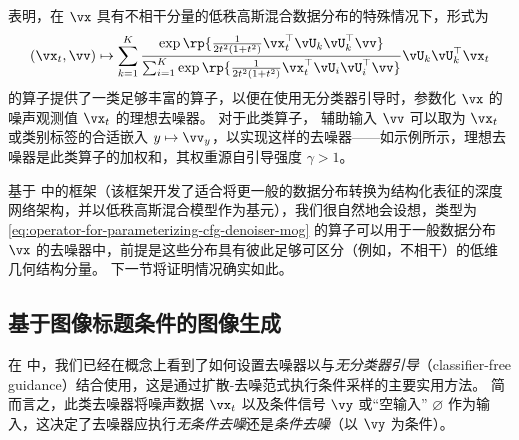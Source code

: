 \documentclass[../../book-main_zh.tex]{subfiles}
\begin{document}
 表明，在 $\vx$ 具有不相干分量的低秩高斯混合数据分布的特殊情况下，形式为
\begin{equation}\label{eq:operator-for-parameterizing-cfg-denoiser-mog}
    (\vx_t, \vv) \mapsto
    \sum_{k = 1}^{K}\frac{
        \exp\rp{\frac{1}{2t^{2}(1
        + t^{2})}\vx_t^\top \vU_k \vU_k^\top \vv}
    }
    {
        \sum_{i
        = 1}^{K}\exp\rp{\frac{1}{2t^{2}(1
        + t^{2})}\vx_t^\top \vU_i \vU_i^\top \vv}
    }
    \vU_{k}\vU_{k}^{\top}\vx_t
\end{equation}
的算子提供了一类足够丰富的算子，以便在使用无分类器引导时，参数化 $\vx$ 的噪声观测值 $\vx_t$ 的理想去噪器。
对于此类算子，
辅助输入 $\vv$ 可以取为 $\vx_t$ 或类别标签的合适嵌入 $y \mapsto \vv_y$，以实现这样的去噪器——如示例所示，理想去噪器是此类算子的加权和，其权重源自引导强度 $\gamma>1$。

基于  中的框架（该框架开发了适合将更一般的数据分布转换为结构化表征的深度网络架构，并以低秩高斯混合模型作为基元），我们很自然地会设想，类型为
\eqref{eq:operator-for-parameterizing-cfg-denoiser-mog} 的算子可以用于一般数据分布 $\vx$ 的去噪器中，前提是这些分布具有彼此足够可区分（例如，不相干）的低维几何结构分量。
下一节将证明情况确实如此。

\subsection{基于图像标题条件的图像生成}\label{sub:text-cond}
在  中，我们已经在概念上看到了如何设置去噪器以与\textit{无分类器引导}（classifier-free guidance）结合使用，这是通过扩散-去噪范式执行条件采样的主要实用方法。
简而言之，此类去噪器将噪声数据 $\vx_t$ 以及条件信号 $\vy$ 或“空输入” $\varnothing$ 作为输入，这决定了去噪器应执行\textit{无条件去噪}还是\textit{条件去噪}（以 $\vy$ 为条件）。
\end{document}
